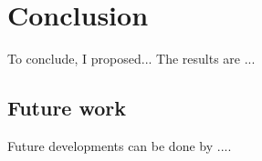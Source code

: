 \chapter{Conclusion}
\label{cha:Figures}

To conclude, I proposed...
The results are ...



\section{Future work}

Future developments can be done by ....
